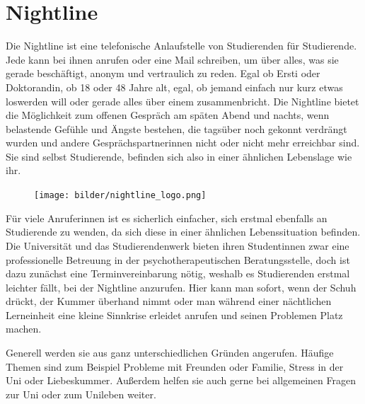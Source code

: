 \section{Nightline}%
Die Nightline ist eine telefonische Anlaufstelle von Studierenden für Studierende. Jede kann bei ihnen anrufen oder eine Mail schreiben, um über alles, was sie gerade beschäftigt, anonym und vertraulich zu reden. Egal ob Ersti oder Doktorandin, ob 18 oder 48 Jahre alt, egal, ob jemand einfach nur kurz etwas loswerden will oder gerade alles über einem zusammenbricht. Die Nightline bietet die Möglichkeit zum offenen Gespräch am späten Abend und nachts, wenn belastende Gefühle und Ängste bestehen, die tagsüber noch gekonnt verdrängt wurden und andere Gesprächspartnerinnen nicht oder nicht mehr erreichbar sind. Sie sind selbst Studierende, befinden sich also in einer ähnlichen Lebenslage wie ihr.

\begin{figure}[b]
    \centering
    \texttt{[image: bilder/nightline\_logo.png]}
\end{figure}


\begin{figure}[!b]
\end{figure}

Für viele Anruferinnen ist es sicherlich einfacher, sich erstmal ebenfalls an Studierende zu wenden, da sich diese in einer ähnlichen Lebenssituation befinden. Die Universität und das Studierendenwerk bieten ihren Studentinnen zwar eine professionelle Betreuung in der psychotherapeutischen Beratungsstelle, doch ist dazu zunächst eine Terminvereinbarung nötig, weshalb es Studierenden erstmal leichter fällt, bei der Nightline anzurufen. Hier kann man sofort, wenn der Schuh drückt, der Kummer überhand nimmt oder man während einer nächtlichen Lerneinheit eine kleine Sinnkrise erleidet anrufen und seinen Problemen Platz machen.

Generell werden sie aus ganz unterschiedlichen Gründen angerufen. Häufige Themen sind zum Beispiel Probleme mit Freunden oder Familie, Stress in der Uni oder Liebeskummer. Außerdem helfen sie auch gerne bei allgemeinen Fragen zur Uni oder zum Unileben weiter.


